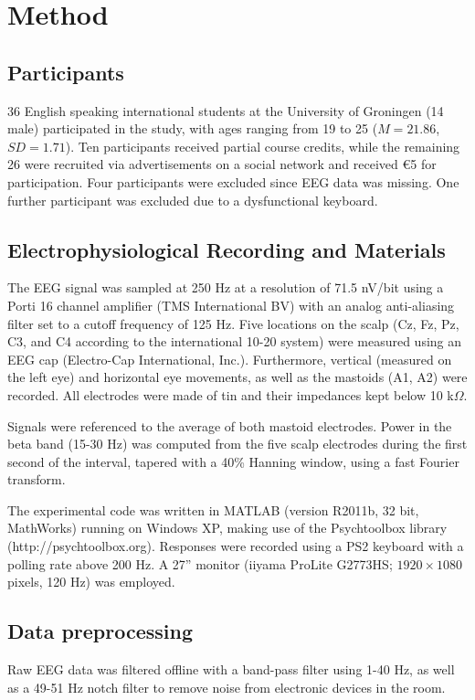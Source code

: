 \documentclass[man,floatsintext]{apa6} %
\begin{document}
\section{Method}
\subsection{Participants}
36 English speaking international students at the University of
Groningen (14 male) participated in the study, with ages ranging from
19 to 25 ($M = 21.86$, $SD = 1.71$). Ten participants received partial
course credits, while the remaining 26 were recruited via
advertisements on a social network and received \euro 5 for
participation. Four participants were excluded since EEG data was
missing. One further participant was excluded due to a dysfunctional
keyboard.

\subsection{Electrophysiological Recording and Materials}
The EEG signal was sampled at 250 Hz at a resolution of 71.5 nV/bit
using a Porti 16 channel amplifier (TMS International BV) with an
analog anti-aliasing filter set to a cutoff frequency of 125 Hz. Five
locations on the scalp (Cz, Fz, Pz, C3, and C4 according to the
international 10-20 system) were measured using an EEG cap
(Electro-Cap International, Inc.). Furthermore, vertical (measured on
the left eye) and horizontal eye movements, as well as the mastoids
(A1, A2) were recorded. All electrodes were made of tin and their
impedances kept below 10 k$\Omega$.

Signals were referenced to the average of both mastoid
electrodes. Power in the beta band (15-30 Hz) was computed from the
five scalp electrodes during the first second of the interval, tapered
with a 40\% Hanning window, using a fast Fourier transform.

The experimental code was written in MATLAB (version R2011b, 32 bit,
MathWorks) running on Windows XP, making use of the Psychtoolbox
library (http://psychtoolbox.org). Responses were recorded using a PS2
keyboard with a polling rate above 200 Hz. A 27'' monitor (iiyama
ProLite G2773HS; $1920 \times 1080$ pixels, 120 Hz) was employed.

\subsection{Data preprocessing}
Raw EEG data was filtered offline with a band-pass filter using 1-40
Hz, as well as a 49-51 Hz notch filter to remove noise from electronic
devices in the room.
\end{document}
